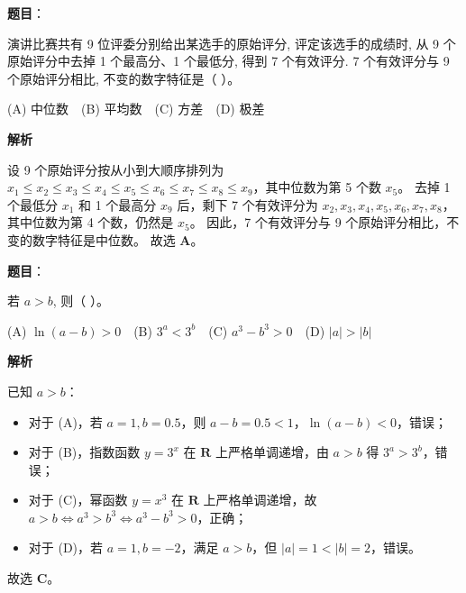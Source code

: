 \begin{answer}

\textbf{题目}：

演讲比赛共有 9 位评委分别给出某选手的原始评分, 评定该选手的成绩时, 从 9 个原始评分中去掉 1 个最高分、1 个最低分, 得到 7 个有效评分. 7 个有效评分与 9 个原始评分相比, 不变的数字特征是（ ）。

(A) 中位数　(B) 平均数　(C) 方差　(D) 极差

\textbf{解析}

设 9 个原始评分按从小到大顺序排列为 $x_1 \leqslant x_2 \leqslant x_3 \leqslant x_4 \leqslant x_5 \leqslant x_6 \leqslant x_7 \leqslant x_8 \leqslant x_9$，其中位数为第 5 个数 $x_5$。
去掉 1 个最低分 $x_1$ 和 1 个最高分 $x_9$ 后，剩下 7 个有效评分为 $x_2, x_3, x_4, x_5, x_6, x_7, x_8$，其中位数为第 4 个数，仍然是 $x_5$。
因此，7 个有效评分与 9 个原始评分相比，不变的数字特征是中位数。
故选 \textbf{A}。


\end{answer}
\begin{answer}

\textbf{题目}：

若 $a > b$, 则（ ）。

(A) $\ln(a-b) > 0$　(B) $3^a < 3^b$　(C) $a^3 - b^3 > 0$　(D) $|a| > |b|$

\textbf{解析}

已知 $a > b$：
\begin{itemize}
\item 对于 (A)，若 $a = 1, b = 0.5$，则 $a - b = 0.5 < 1$，$\ln(a-b) < 0$，错误；
\item 对于 (B)，指数函数 $y = 3^x$ 在 $\mathbf{R}$ 上严格单调递增，由 $a > b$ 得 $3^a > 3^b$，错误；
\item 对于 (C)，幂函数 $y = x^3$ 在 $\mathbf{R}$ 上严格单调递增，故 $a > b \iff a^3 > b^3 \iff a^3 - b^3 > 0$，正确；
\item 对于 (D)，若 $a = 1, b = -2$，满足 $a > b$，但 $|a| = 1 < |b| = 2$，错误。
\end{itemize}
故选 \textbf{C}。


\end{answer}
